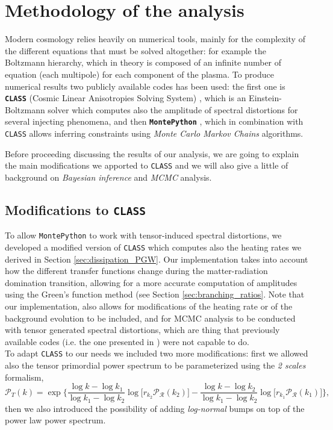 \section{Methodology of the analysis}
Modern cosmology relies heavily on numerical tools, mainly for the complexity of the different equations that must be solved altogether: for example the Boltzmann hierarchy, which in theory is composed of an infinite number of equation (each multipole) for each component of the plasma.
To produce numerical results two publicly available codes has been used: the first one is \textbf{\texttt{CLASS}} (Cosmic Linear Anisotropies Solving System) \cite{CLASS}, which is an Einstein-Boltzmann solver which computes also the amplitude of spectral distortions for several injecting phenomena, and then \textbf{\texttt{MontePython}} \cite{Brinckmann:2018cvx,Audren:2012wb}, which in combination with \texttt{CLASS} allows inferring constraints using \emph{Monte Carlo Markov Chains} algorithms.

Before proceeding discussing the results of our analysis, we are going to explain the main modifications we apported to \texttt{CLASS} and we will also give a little of background on \textit{Bayesian inference} and \textit{MCMC} analysis.
\subsection{Modifications to \texttt{CLASS}}
To allow \texttt{MontePython} to work with tensor-induced spectral distortions, we developed a modified version of \texttt{CLASS} which computes also the heating rates we derived in Section \ref{sec:dissipation_PGW}. Our implementation takes into account how the different transfer functions change during the matter-radiation domination transition, allowing for a more accurate computation of amplitudes using the Green's function method (see Section \ref{sec:branching_ratios}. Note that our implementation, also allows for modifications of the heating rate or of the background evolution to be included, and for MCMC analysis to be conducted with tensor generated spectral distortions, which are thing that previously available codes (i.e. the one presented in \cite{Kite_2021}) were not capable to do.\\
To adapt \texttt{CLASS} to our needs we included two more modifications: first we allowed also the tensor primordial power spectrum to be parameterized using the \emph{2 scales} formalism, 
$$\mathcal P_T(k)=\exp\bigg\{\frac{\log k-\log k_1}{\log k_1 -\log k_2}\log \Big[r_{k_2}\mathcal{P_R}(k_2)\Big]-\frac{\log k-\log k_2}{\log k_1 -\log k_2}\log \Big[r_{k_1}\mathcal{ P_{R}}(k_1)\Big]\bigg\},$$
 then we also introduced the possibility of adding \emph{log-normal} bumps on top of the power law power spectrum.
